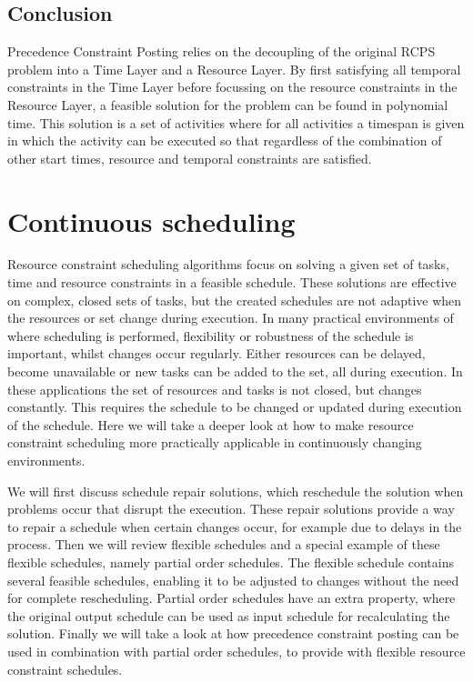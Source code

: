 \documentclass{article}
\begin{document}
\subsection{Conclusion}
Precedence Constraint Posting relies on the decoupling of the original RCPS problem into a Time Layer and a Resource Layer. By first satisfying all temporal constraints in the Time Layer before focussing on the resource constraints in the Resource Layer, a feasible solution for the problem can be found in polynomial time. This solution is a set of activities where for all activities a timespan is given in which the activity can be executed so that regardless of the combination of other start times, resource and temporal constraints are satisfied.

\newpage

\section{Continuous scheduling}

Resource constraint scheduling algorithms focus on solving a given set of tasks, time and resource constraints in a feasible schedule.
These solutions are effective on complex, closed sets of tasks, but the created schedules are not adaptive when the resources or set change during execution.
In many practical environments of where scheduling is performed, flexibility or robustness of the schedule is important, whilst changes occur regularly.
Either resources can be delayed, become unavailable or new tasks can be added to the set, all during execution.
In these applications the set of resources and tasks is not closed, but changes constantly.
This requires the schedule to be changed or updated during execution of the schedule.
Here we will take a deeper look at how to make resource constraint scheduling more practically applicable in continuously changing environments.

We will first discuss schedule repair solutions, which reschedule the solution when problems occur that disrupt the execution.
These repair solutions provide a way to repair a schedule when certain changes occur, for example due to delays in the process.
Then we will review flexible schedules and a special example of these flexible schedules, namely partial order schedules.
The flexible schedule contains several feasible schedules, enabling it to be adjusted to changes without the need for complete rescheduling.
Partial order schedules have an extra property, where the original output schedule can be used as input schedule for recalculating the solution.
Finally we will take a look at how precedence constraint posting can be used in combination with partial order schedules, to provide with flexible resource constraint schedules.
\end{document}
